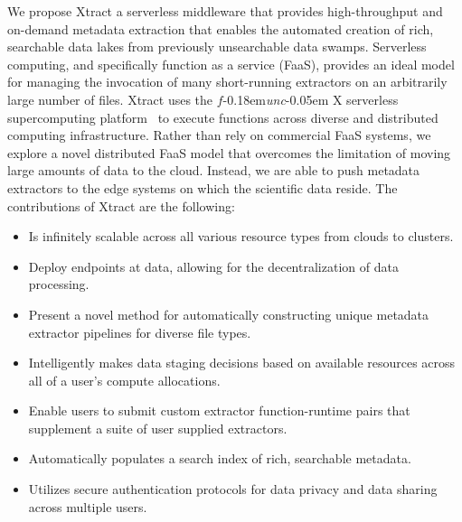 \documentclass[sigconf, 9pt]{acmart}
\newcommand{\tyler}[1]{}
\newcommand{\kyle}[1]{}
\newcommand{\tyler}[1]{{\textcolor{cyan}{ tyler: #1 }}}
\newcommand{\kyle}[1]{{\textcolor{purple}{ Kyle: #1 }}}
\newcommand{\name}{Xtract}
\newcommand{\funcx}{$f$\kern-0.18em\emph{unc}\kern-0.05em X}
\begin{document}
We propose \name{}
a serverless middleware that provides high-throughput and on-demand metadata 
extraction that enables the automated creation of rich, searchable data lakes from previously unsearchable data swamps. 
Serverless computing, and specifically function as a service (FaaS),
provides an ideal model for managing the invocation of
many short-running extractors on an arbitrarily large number of files. 
\name{} uses the \funcx{} serverless supercomputing platform~\cite{chard2019serverless}
to execute functions across diverse and distributed computing infrastructure.
Rather than rely on commercial FaaS systems, we explore a novel distributed FaaS model 
that overcomes the limitation of moving large amounts of data to the cloud. 
Instead, we are able to push
metadata extractors to the edge systems on which the scientific data reside. 
The contributions of \name{} are the following: 
\begin{itemize}
\item Is infinitely scalable across all various resource types from clouds to clusters. 
\item Deploy endpoints at data, allowing for the decentralization of data processing. 
\item Present a novel method for automatically constructing unique metadata extractor pipelines for diverse file types. 
\item Intelligently makes data staging decisions based on available resources across all of a user's compute allocations. %
\item Enable users to submit custom extractor function-runtime pairs that supplement a suite of user supplied extractors.
\item Automatically populates a search index of rich, searchable metadata. 
\item Utilizes secure authentication protocols for data privacy and data sharing across multiple users. 
\end{itemize}

\end{document}
